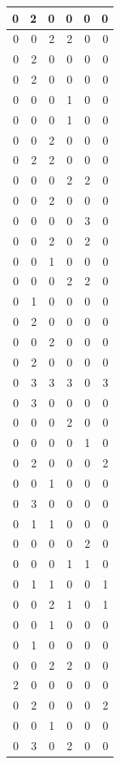 \documentclass[
  12pt,
]{krantz}
\begin{document}
\begin{tabular}{r|r|r|r|r|r}
\hline
0 & 2 & 0 & 0 & 0 & 0\\
\hline
0 & 0 & 2 & 2 & 0 & 0\\
\hline
0 & 2 & 0 & 0 & 0 & 0\\
\hline
0 & 2 & 0 & 0 & 0 & 0\\
\hline
0 & 0 & 0 & 1 & 0 & 0\\
\hline
0 & 0 & 0 & 1 & 0 & 0\\
\hline
0 & 0 & 2 & 0 & 0 & 0\\
\hline
0 & 2 & 2 & 0 & 0 & 0\\
\hline
0 & 0 & 0 & 2 & 2 & 0\\
\hline
0 & 0 & 2 & 0 & 0 & 0\\
\hline
0 & 0 & 0 & 0 & 3 & 0\\
\hline
0 & 0 & 2 & 0 & 2 & 0\\
\hline
0 & 0 & 1 & 0 & 0 & 0\\
\hline
0 & 0 & 0 & 2 & 2 & 0\\
\hline
0 & 1 & 0 & 0 & 0 & 0\\
\hline
0 & 2 & 0 & 0 & 0 & 0\\
\hline
0 & 0 & 2 & 0 & 0 & 0\\
\hline
0 & 2 & 0 & 0 & 0 & 0\\
\hline
0 & 3 & 3 & 3 & 0 & 3\\
\hline
0 & 3 & 0 & 0 & 0 & 0\\
\hline
0 & 0 & 0 & 2 & 0 & 0\\
\hline
0 & 0 & 0 & 0 & 1 & 0\\
\hline
0 & 2 & 0 & 0 & 0 & 2\\
\hline
0 & 0 & 1 & 0 & 0 & 0\\
\hline
0 & 3 & 0 & 0 & 0 & 0\\
\hline
0 & 1 & 1 & 0 & 0 & 0\\
\hline
0 & 0 & 0 & 0 & 2 & 0\\
\hline
0 & 0 & 0 & 1 & 1 & 0\\
\hline
0 & 1 & 1 & 0 & 0 & 1\\
\hline
0 & 0 & 2 & 1 & 0 & 1\\
\hline
0 & 0 & 1 & 0 & 0 & 0\\
\hline
0 & 1 & 0 & 0 & 0 & 0\\
\hline
0 & 0 & 2 & 2 & 0 & 0\\
\hline
2 & 0 & 0 & 0 & 0 & 0\\
\hline
0 & 2 & 0 & 0 & 0 & 2\\
\hline
0 & 0 & 1 & 0 & 0 & 0\\
\hline
0 & 3 & 0 & 2 & 0 & 0\\

\end{tabular}
\end{document}
